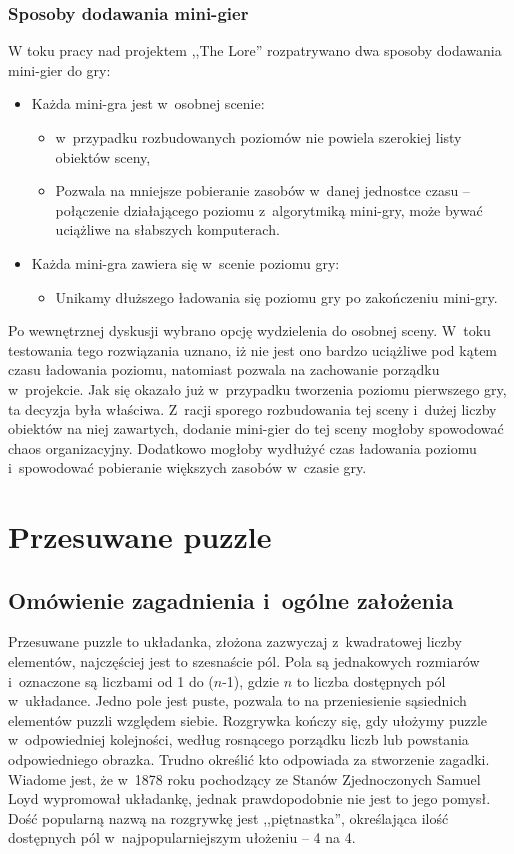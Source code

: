 \documentclass[oneside,polski,logo]{amuthesis}
\begin{document}
\subsubsection{Sposoby dodawania mini-gier}
\par W toku pracy nad projektem ,,The Lore'' rozpatrywano dwa sposoby dodawania mini-gier do gry:
\begin{itemize}
\item{Każda mini-gra jest w~osobnej scenie:}
\begin{itemize}
\item w~przypadku rozbudowanych poziomów nie powiela szerokiej listy obiektów sceny,
\item Pozwala na mniejsze pobieranie zasobów w~danej jednostce czasu – połączenie działającego poziomu z~algorytmiką mini-gry, może bywać uciążliwe na słabszych komputerach.
\end{itemize}
\item{Każda mini-gra zawiera się w~scenie poziomu gry:}
\begin{itemize}
\item Unikamy dłuższego ładowania się poziomu gry po zakończeniu mini-gry.
\end{itemize}
\end{itemize}
Po wewnętrznej dyskusji wybrano opcję wydzielenia do osobnej sceny. W~toku testowania tego rozwiązania uznano, iż nie jest ono bardzo uciążliwe pod kątem czasu ładowania poziomu, natomiast pozwala na zachowanie porządku w~projekcie. Jak się okazało już w~przypadku tworzenia poziomu pierwszego gry, ta decyzja była właściwa. Z~racji sporego rozbudowania tej sceny i~dużej liczby obiektów na niej zawartych, dodanie mini-gier do tej sceny mogłoby spowodować chaos organizacyjny. Dodatkowo mogłoby wydłużyć czas ładowania poziomu i~spowodować pobieranie większych zasobów w~czasie gry.


\section{Przesuwane puzzle}
\subsection{Omówienie zagadnienia i~ogólne założenia}
\par Przesuwane puzzle to układanka, złożona zazwyczaj z~kwadratowej liczby elementów, najczęściej jest to szesnaście pól. Pola są jednakowych rozmiarów i~oznaczone są liczbami od 1 do (\(n\)-1), gdzie \(n\) to liczba dostępnych pól w~układance. Jedno pole jest puste, pozwala to na przeniesienie sąsiednich elementów puzzli względem siebie. Rozgrywka kończy się, gdy ułożymy puzzle w~odpowiedniej kolejności, według rosnącego porządku liczb lub powstania odpowiedniego obrazka. Trudno określić kto odpowiada za stworzenie zagadki. Wiadome jest, że w~1878 roku pochodzący ze Stanów Zjednoczonych Samuel Loyd wypromował układankę, jednak prawdopodobnie nie jest to jego pomysł. Dość popularną nazwą na rozgrywkę jest ,,piętnastka'', określająca ilość dostępnych pól w~najpopularniejszym ułożeniu – 4 na 4.  \cite{przesuwane_puzzle}
\end{document}
